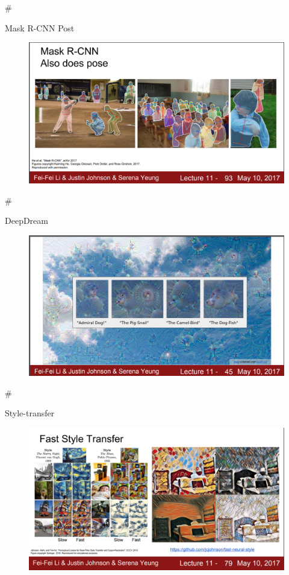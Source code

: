 \documentclass[11pt]{article}
\makeatletter
\def\maxwidth{\ifdim\Gin@nat@width>\linewidth\linewidth
    \else\Gin@nat@width\fi}
\let\Oldincludegraphics\includegraphics
\renewcommand{\includegraphics}[1]{\Oldincludegraphics[width=.8\maxwidth]{#1}}
\makeatother
\begin{document}
    \#

Mask R-CNN Post

\begin{figure}
\centering
\includegraphics{r-cnn-pose.png}
\caption{}
\end{figure}

    \#

DeepDream

\begin{figure}
\centering
\includegraphics{deepdream.png}
\caption{}
\end{figure}

    \#

Style-transfer

\begin{figure}
\centering
\includegraphics{style-transfer.png}
\caption{}
\end{figure}
\end{document}

